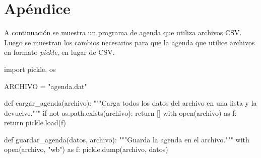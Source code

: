 \newpage
\section{Apéndice}

A continuación se muestra un programa de agenda que utiliza archivos
CSV\@. Luego se muestran los cambios necesarios para que la agenda que utilice archivos
en formato \emph{pickle}, en lugar de CSV.



\begin{codigo-python}
import pickle, os

ARCHIVO = "agenda.dat"

def cargar_agenda(archivo):
    """Carga todos los datos del archivo en una lista y la devuelve."""
    if not os.path.exists(archivo):
        return []
    with open(archivo) as f:
        return pickle.load(f)

def guardar_agenda(datos, archivo):
    """Guarda la agenda en el archivo."""
    with open(archivo, "wb") as f:
        pickle.dump(archivo, datos)
\end{codigo-python}
